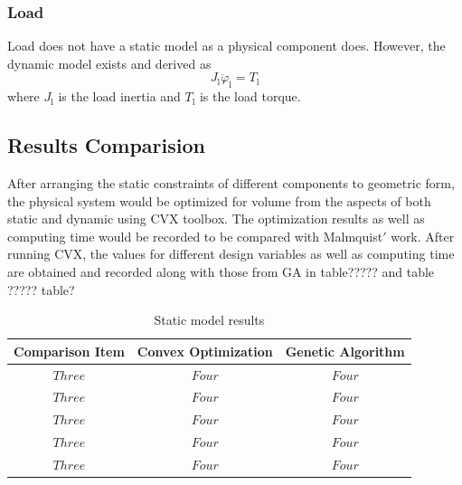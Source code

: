 \subsubsection*{Load}
Load does not have a static model as a physical component does. However, the dynamic model exists and derived as
\begin{equation} \label{eq:cs18}
J_{\text{l}}\ddot{\varphi}_{\text{l}} = T_{\text{l}}
\end{equation}
where $J_{\text{l}}$ is the load inertia and $T_{\text{l}}$ is the load torque.  
\subsection*{Results Comparision}
After arranging the static constraints of different components to geometric form, the physical system would be optimized for volume from the aspects of both static and dynamic using CVX toolbox. The optimization results as well as computing time would be recorded to be compared with Malmquist$'$ work. 
After running CVX, the values for different design variables as well as computing time are obtained and recorded along with those from GA  in table????? and table ?????
table?                                     
\begin{table}[h]
\caption{Static model results}
\label{sta}
\begin{center}
\begin{tabular}{|c||c||c|}
\hline
Comparison Item & Convex Optimization & Genetic Algorithm\\
\hline
$Three$ & $Four$ & $Four$\\
\hline
$Three$ & $Four$ & $Four$\\
\hline
$Three$ & $Four$ & $Four$\\
\hline
$Three$ & $Four$ & $Four$\\
\hline
$Three$ & $Four$ & $Four$\\
\hline
\end{tabular}
\end{center}
\end{table}

